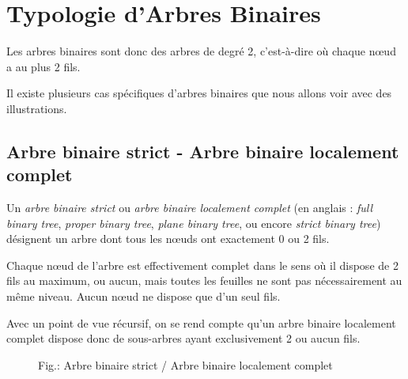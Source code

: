 \documentclass[11pt,a4paper]{article}
\begin{document}
\section{Typologie d'Arbres Binaires}

\bigskip

Les arbres binaires sont donc des arbres de degré 2, c'est-à-dire où chaque nœud a au plus 2 fils.

Il existe plusieurs cas spécifiques d'arbres binaires que nous allons voir avec des illustrations.


\medskip


\subsection{Arbre binaire strict - Arbre binaire localement complet}

Un \textit{arbre binaire strict} ou \textit{arbre binaire localement complet} (en anglais : \textit{full binary tree}, \textit{proper binary tree}, \textit{plane binary tree}, ou encore \textit{strict binary tree}) désignent un arbre dont tous les nœuds ont exactement 0 ou 2 fils.

Chaque nœud de l'arbre est effectivement complet dans le sens où il dispose de 2 fils au maximum, ou aucun, mais toutes les feuilles ne sont pas nécessairement au même niveau.
Aucun nœud ne dispose que d'un seul fils.

Avec un point de vue récursif, on se rend compte qu'un arbre binaire localement complet dispose donc de sous-arbres ayant exclusivement 2 ou aucun fils.

\begin{figure}[ht!]
\caption{Fig.\thefigure : Arbre binaire strict / Arbre binaire localement complet}
\label{fig:example2-full-binary-tree}
\end{figure}
\end{document}
